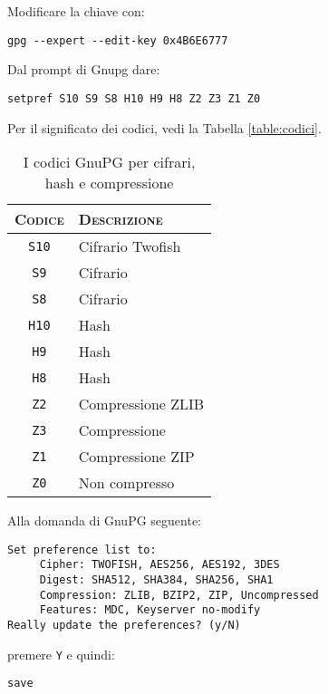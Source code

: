 Modificare la chiave con:

\begin{lstlisting}
gpg --expert --edit-key 0x4B6E6777
\end{lstlisting}

Dal prompt di Gnupg dare:

\begin{lstlisting}
setpref S10 S9 S8 H10 H9 H8 Z2 Z3 Z1 Z0
\end{lstlisting}

Per il significato dei codici, vedi la Tabella \vref{table:codici}.

\begin{table}
   \centering
	\begin{tabularx}{6cm}{cl}
 		\toprule
		\textsc{Codice} & \textsc{Descrizione} \\
		\midrule
		\texttt{S10} & Cifrario Twofish \\
		\texttt{S9}  & Cifrario \numerimaiuscoli{AES256} \\
		\texttt{S8}  & Cifrario \numerimaiuscoli{AES192} \\
		\texttt{H10} & Hash \numerimaiuscoli{SHA512} \\
		\texttt{H9}  & Hash \numerimaiuscoli{SHA384} \\
		\texttt{H8}  & Hash \numerimaiuscoli{SHA256} \\
		\texttt{Z2}  & Compressione ZLIB \\
		\texttt{Z3}  & Compressione \numerimaiuscoli{BZIP2} \\
		\texttt{Z1}  & Compressione ZIP \\
		\texttt{Z0}  & Non compresso \\
		\bottomrule
	\end{tabularx}
	\caption{I codici GnuPG per cifrari, hash e compressione}
	\label{table:codici}
\end{table}

Alla domanda di GnuPG seguente:

\begin{lstlisting}
Set preference list to:
     Cipher: TWOFISH, AES256, AES192, 3DES
     Digest: SHA512, SHA384, SHA256, SHA1
     Compression: ZLIB, BZIP2, ZIP, Uncompressed
     Features: MDC, Keyserver no-modify
Really update the preferences? (y/N)
\end{lstlisting}

premere \texttt{Y} e quindi:

\begin{lstlisting}
save
\end{lstlisting}

